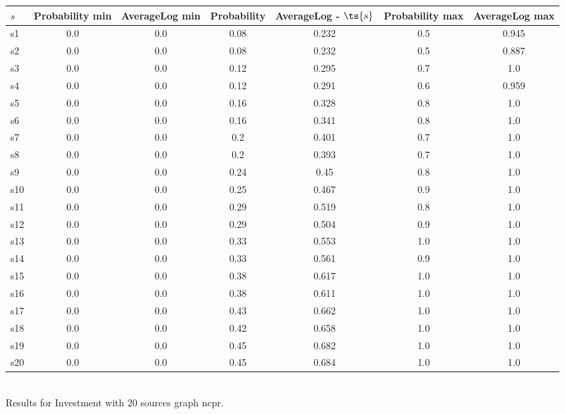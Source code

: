 \documentclass{article}
\begin{document}
\noindent\begin{tabular}{|l|c|c|c|c|c|c|}
\hline
$s$& Probability min & AverageLog min & Probability & AverageLog - $\ts{s}$ & Probability max & AverageLog max\\
\hline
s1 &0.0 & 0.0 & 0.08 & 0.232 & 0.5 & 0.945\\
\hline
s2 &0.0 & 0.0 & 0.08 & 0.232 & 0.5 & 0.887\\
\hline
s3 &0.0 & 0.0 & 0.12 & 0.295 & 0.7 & 1.0\\
\hline
s4 &0.0 & 0.0 & 0.12 & 0.291 & 0.6 & 0.959\\
\hline
s5 &0.0 & 0.0 & 0.16 & 0.328 & 0.8 & 1.0\\
\hline
s6 &0.0 & 0.0 & 0.16 & 0.341 & 0.8 & 1.0\\
\hline
s7 &0.0 & 0.0 & 0.2 & 0.401 & 0.7 & 1.0\\
\hline
s8 &0.0 & 0.0 & 0.2 & 0.393 & 0.7 & 1.0\\
\hline
s9 &0.0 & 0.0 & 0.24 & 0.45 & 0.8 & 1.0\\
\hline
s10 &0.0 & 0.0 & 0.25 & 0.467 & 0.9 & 1.0\\
\hline
s11 &0.0 & 0.0 & 0.29 & 0.519 & 0.8 & 1.0\\
\hline
s12 &0.0 & 0.0 & 0.29 & 0.504 & 0.9 & 1.0\\
\hline
s13 &0.0 & 0.0 & 0.33 & 0.553 & 1.0 & 1.0\\
\hline
s14 &0.0 & 0.0 & 0.33 & 0.561 & 0.9 & 1.0\\
\hline
s15 &0.0 & 0.0 & 0.38 & 0.617 & 1.0 & 1.0\\
\hline
s16 &0.0 & 0.0 & 0.38 & 0.611 & 1.0 & 1.0\\
\hline
s17 &0.0 & 0.0 & 0.43 & 0.662 & 1.0 & 1.0\\
\hline
s18 &0.0 & 0.0 & 0.42 & 0.658 & 1.0 & 1.0\\
\hline
s19 &0.0 & 0.0 & 0.45 & 0.682 & 1.0 & 1.0\\
\hline
s20 &0.0 & 0.0 & 0.45 & 0.684 & 1.0 & 1.0\\
\hline
\end{tabular}\\

\noindent Results for Investment with 20 sources graph ncpr.
\end{document}

